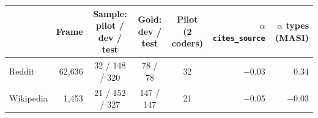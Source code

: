 \begin{tabular}{lrcccrr}
\toprule
 & Frame & Sample: pilot / dev / test & Gold: dev / test & Pilot (2 coders) & $\alpha$ \texttt{cites\_source} & $\alpha$ types (MASI) \\
\midrule
Reddit & 62,636 & 32 / 148 / 320 & 78 / 78 & 32 & $-$0.03 & 0.34 \\
Wikipedia & 1,453 & 21 / 152 / 327 & 147 / 147 & 21 & $-$0.05 & $-$0.03 \\
\bottomrule
\end{tabular}
